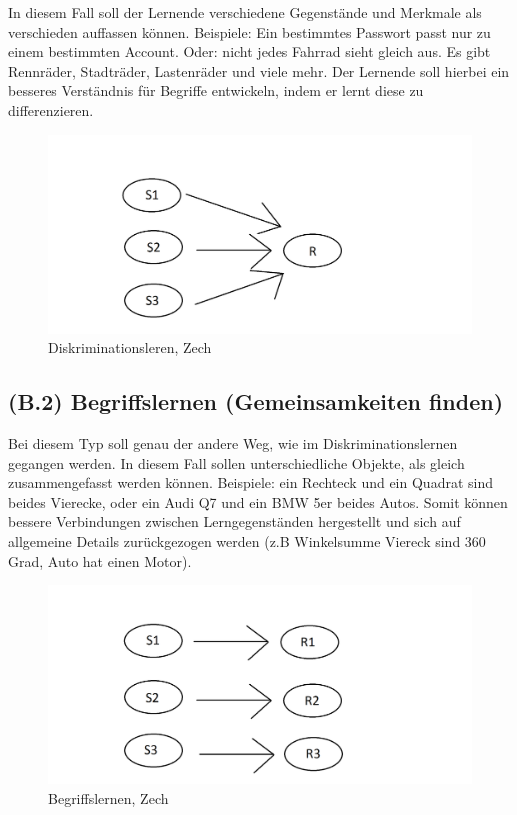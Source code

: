 In diesem Fall soll der Lernende verschiedene Gegenstände und Merkmale als verschieden auffassen können. Beispiele: Ein bestimmtes Passwort passt nur zu einem bestimmten Account. Oder: nicht jedes Fahrrad sieht gleich aus. Es gibt Rennräder, Stadträder, Lastenräder und viele mehr. Der Lernende soll hierbei ein besseres Verständnis für Begriffe entwickeln, indem er lernt diese zu differenzieren\cite{zech1983grundkurs}.

\begin{figure}[!ht]
\noindent\hspace{0.5mm}\includegraphics[width=12cm]{./Ressourcen/Diskrimination.png}
\caption{Diskriminationsleren, Zech}
\end{figure}

\subsection[]{(B.2) Begriffslernen (Gemeinsamkeiten finden)}

Bei diesem Typ soll genau der andere Weg, wie im Diskriminationslernen gegangen werden. In diesem Fall sollen unterschiedliche Objekte, als gleich zusammengefasst werden können. 
Beispiele: ein Rechteck und ein Quadrat sind beides Vierecke, oder ein Audi Q7 und ein BMW 5er beides Autos. Somit können bessere Verbindungen zwischen Lerngegenständen hergestellt und sich auf allgemeine Details zurückgezogen werden (z.B Winkelsumme Viereck sind 360 Grad, Auto hat einen Motor)\cite{zech1983grundkurs}.

\begin{figure}[!ht]
\noindent\hspace{0.5mm}\includegraphics[width=12cm]{./Ressourcen/Begriffslernen.png}
\caption{Begriffslernen, Zech}
\end{figure}

